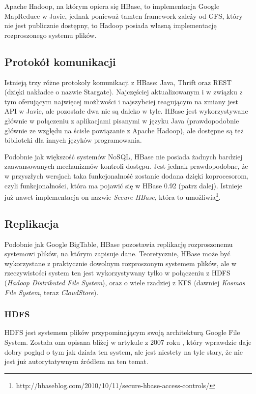 Apache Hadoop, na którym opiera się HBase, to implementacja Google MapReduce w Javie, jednak ponieważ tamten framework zależy od GFS, który nie jest publicznie dostępny, to Hadoop posiada własną implementację rozproszonego systemu plików.

\subsection*{Protokół komunikacji}

Istnieją trzy różne protokoły komunikacji z HBase: Java, Thrift oraz REST (dzięki nakładce o nazwie Stargate).
Najczęściej aktualizowanym i w związku z tym oferującym najwięcej możliwości i najszybciej reagującym na zmiany jest API w Javie, ale pozostałe dwa nie są daleko w tyle.
HBase jest wykorzystywane głównie w połączeniu z aplikacjami pisanymi w języku Java (prawdopodobnie głównie ze względu na ścisłe powiązanie z Apache Hadoop), ale dostępne są też biblioteki dla innych języków programowania.

Podobnie jak większość systemów NoSQL, HBase nie posiada żadnych bardziej zaawansowanych mechanizmów kontroli dostępu.
Jest jednak prawdopodobne, że w przyszłych wersjach taka funkcjonalność zostanie dodana dzięki koprocesorom, czyli funkcjonalności, która ma pojawić się w HBase 0.92 (patrz dalej).
Istnieje już nawet implementacja on nazwie \emph{Secure HBase}, która to umożliwia\footnote{http://hbaseblog.com/2010/10/11/secure-hbase-access-controls/}.

\subsection*{Replikacja}

Podobnie jak Google BigTable, HBase pozostawia replikację rozproszonemu systemowi plików, na którym zapisuje dane.
Teoretycznie, HBase może być wykorzystane z praktycznie dowolnym rozproszonym systemem plików, ale w rzeczywistości system ten jest wykorzystywany tylko w połączeniu z HDFS (\emph{Hadoop Distributed File System}), oraz o wiele rzadziej z KFS (dawniej \emph{Kosmos File System}, teraz \emph{CloudStore}).

\subsubsection*{HDFS}

HDFS jest systemem plików przypominającym swoją architekturą Google File System.
Została ona opisana bliżej w artykule z 2007 roku \cite{hdfs-architecture}, który wprawdzie daje dobry pogląd o tym jak działa ten system, ale jest niestety na tyle stary, że nie jest już autorytatywnym źródłem na ten temat.

